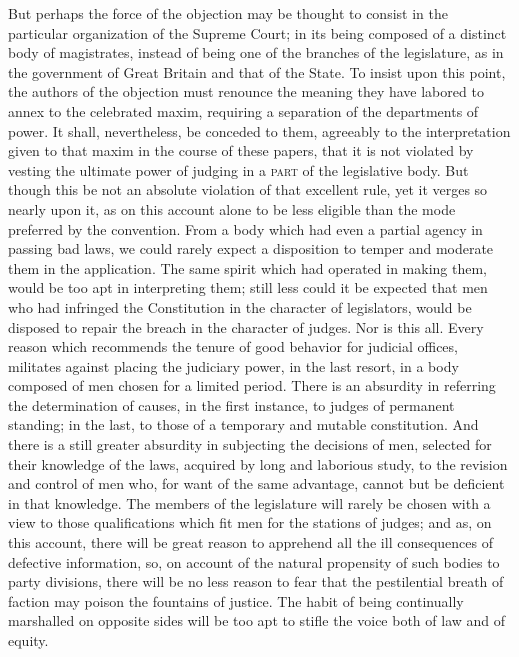 But perhaps the force of the objection may be thought to consist in the particular organization of the Supreme Court; in its being composed of a distinct body of magistrates, instead of being one of the branches of the legislature, as in the government of Great Britain and that of the State. 
To insist upon this point, the authors of the objection must renounce the meaning they have labored to annex to the celebrated maxim, requiring a separation of the departments of power. 
It shall, nevertheless, be conceded to them, agreeably to the interpretation given to that maxim in the course of these papers, that it is not violated by vesting the ultimate power of judging in a \textsc{part} of the legislative body. 
But though this be not an absolute violation of that excellent rule, yet it verges so nearly upon it, as on this account alone to be less eligible than the mode preferred by the convention. 
From a body which had even a partial agency in passing bad laws, we could rarely expect a disposition to temper and moderate them in the application. 
The same spirit which had operated in making them, would be too apt in interpreting them; still less could it be expected that men who had infringed the Constitution in the character of legislators, would be disposed to repair the breach in the character of judges. 
Nor is this all. 
Every reason which recommends the tenure of good behavior for judicial offices, militates against placing the judiciary power, in the last resort, in a body composed of men chosen for a limited period. 
There is an absurdity in referring the determination of causes, in the first instance, to judges of permanent standing; in the last, to those of a temporary and mutable constitution. 
And there is a still greater absurdity in subjecting the decisions of men, selected for their knowledge of the laws, acquired by long and laborious study, to the revision and control of men who, for want of the same advantage, cannot but be deficient in that knowledge. 
The members of the legislature will rarely be chosen with a view to those qualifications which fit men for the stations of judges; and as, on this account, there will be great reason to apprehend all the ill consequences of defective information, so, on account of the natural propensity of such bodies to party divisions, there will be no less reason to fear that the pestilential breath of faction may poison the fountains of justice. 
The habit of being continually marshalled on opposite sides will be too apt to stifle the voice both of law and of equity.

